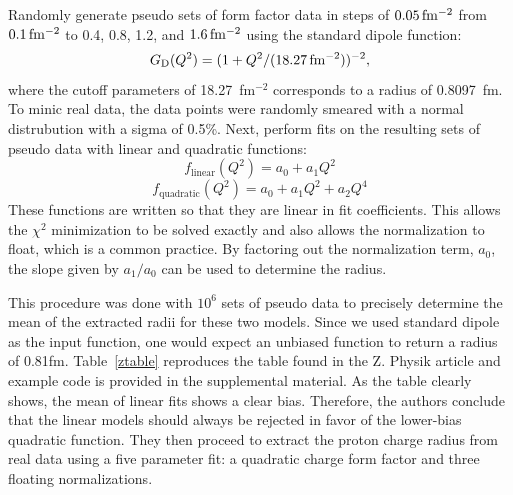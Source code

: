 \documentclass[10pt,aps,prc,twocolumn]{revtex4-1}
\begin{document}
Randomly generate pseudo sets of form factor data in steps 
of $\unit[0.05]{fm^{-2}}$ from $\unit[0.1]{fm^{-2}}$ to 0.4, 0.8, 1.2,
and $\unit[1.6]{fm^{-2}}$ using the standard dipole function:
\begin{equation}
\label{sd}
G\mathrm{_D}(Q^2) = ( 1 + Q^2/(\unit[18.27]{fm^{-2}}))^{-2},
\end{equation}
where the cutoff parameters of 18.27~fm$^{-2}$ corresponds to a radius of 0.8097~fm.
To minic real data, the data points were randomly smeared with a normal distrubution
with a sigma of 0.5\%.  
Next, perform fits on the resulting sets of pseudo data with linear and quadratic functions:
\begin{equation}
f_{\mathrm{linear}}(Q^2)  = a_0 + a_1 Q^2
\end{equation}
\begin{equation}
f_{\mathrm{quadratic}}(Q^2)  = a_0 + a_1 Q^2 + a_2 Q^4 
\end{equation}
These functions are written so that they are linear in fit coefficients.  This allows the $\chi^2$ minimization to be solved exactly
and also allows the normalization to float, which is a common practice.   By factoring out the normalization term, $a_0$, 
the slope given by $a_1/a_0$ can be used to determine the radius.

This procedure was done with $10^6$ sets of pseudo data to 
precisely determine the mean of the extracted 
radii for these two models.   Since we used standard dipole as the input function, one would expect an unbiased 
function to return a radius of 0.81fm.
Table~\ref{ztable} reproduces the table found in the
Z. Physik article and example code is provided in the supplemental material.
As the table clearly shows, the mean of linear fits shows a clear bias. 
Therefore, the authors conclude that the linear models should always be rejected in favor of the lower-bias quadratic function.
They then proceed to extract the proton charge radius from real data using a five parameter fit: a quadratic charge form factor 
and three floating normalizations.
\end{document}
